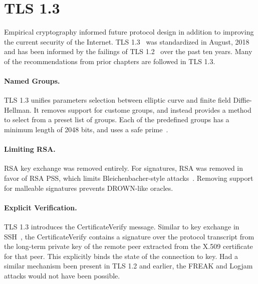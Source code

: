 
\section{TLS 1.3}

Empirical cryptography informed future protocol design in addition to
improving the current security of the Internet. TLS 1.3~\cite{rfc8446} was
standardized in August, 2018 and has been informed by the failings of TLS
1.2~\cite{tls-ietf-inria-bug,tls-ietf-smacktls,tls-ietf-rsa-pss} over the
past ten years. Many of the recommendations from prior chapters are followed
in TLS 1.3.

\paragraph{Named Groups.}
TLS 1.3 unifies parameters selection between elliptic curve and finite field
Diffie-Hellman. It removes support for custome \dhe{} groups, and instead
provides a method to select from a preset list of groups. Each of the
predefined groups has a minimum length of 2048 bits, and uses a safe
prime~\cite{rfc7919}.

\paragraph{Limiting RSA.}
RSA key exchange was removed entirely. For signatures, RSA \PKCS was removed
in favor of RSA PSS, which limits Bleichenbacher-style
attacks~\cite{exact-security-rsa}. Removing support for malleable \PKCS
signatures prevents DROWN-like oracles.

\paragraph{Explicit Verification.}
TLS 1.3 introduces the \textsf{CertificateVerify} message. Similar to key
exchange in SSH~\cite{rfc4253}, the \textsf{CertificateVerify} contains a
signature over the protocol transcript from the long-term private key of the
remote peer extracted from the X.509 certificate for that peer. This
explicitly binds the state of the connection to key. Had a similar mechanism
been present in TLS 1.2 and earlier, the FREAK and Logjam attacks would not
have been possible.

